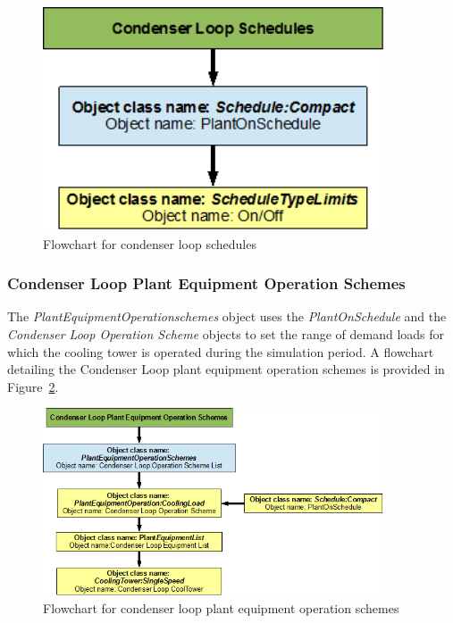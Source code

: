 \begin{figure}[hbtp] %
\centering
\includegraphics[width=0.9\textwidth, height=0.9\textheight, keepaspectratio=true]{media/image070.png}
\caption{Flowchart for condenser loop schedules \protect \label{fig:flowchart-for-condenser-loop-schedules}}
\end{figure}

\subsubsection{Condenser Loop Plant Equipment Operation Schemes}\label{condenser-loop-plant-equipment-operation-schemes}

The \emph{PlantEquipmentOperationschemes} object uses the \emph{PlantOnSchedule} and the \emph{Condenser Loop Operation Scheme} objects to set the range of demand loads for which the cooling tower is operated during the simulation period. A flowchart detailing the Condenser Loop plant equipment operation schemes is provided in Figure~\ref{fig:flowchart-for-condenser-loop-plant-equipment-operation}.

\begin{figure}[hbtp] %
\centering
\includegraphics[width=0.9\textwidth, height=0.9\textheight, keepaspectratio=true]{media/image071.png}
\caption{Flowchart for condenser loop plant equipment operation schemes \protect \label{fig:flowchart-for-condenser-loop-plant-equipment-operation}}
\end{figure}

